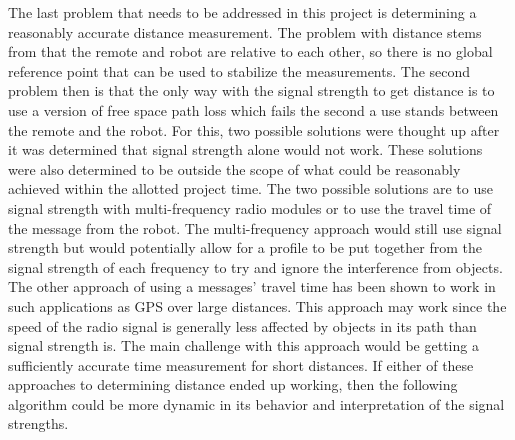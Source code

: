 The last problem that needs to be addressed in this project is determining a reasonably accurate distance measurement.  The problem with distance stems from that the remote and robot are relative to each other, so there is no global reference point that can be used to stabilize the measurements.  The second problem then is that the only way with the signal strength to get distance is to use a version of free space path loss which fails the second a use stands between the remote and the robot.  For this, two possible solutions were thought up after it was determined that signal strength alone would not work.  These solutions were also determined to be outside the scope of what could be reasonably achieved within the allotted project time.  The two possible solutions are to use signal strength with multi-frequency radio modules or to use the travel time of the message from the robot.  The multi-frequency approach would still use signal strength but would potentially allow for a profile to be put together from the signal strength of each frequency to try and ignore the interference from objects.  The other approach of using a messages' travel time has been shown to work in such applications as GPS over large distances.  This approach may work since the speed of the radio signal is generally less affected by objects in its path than signal strength is.  The main challenge with this approach would be getting a sufficiently accurate time measurement for short distances.  If either of these approaches to determining distance ended up working, then the following algorithm could be more dynamic in its behavior and interpretation of the signal strengths.

